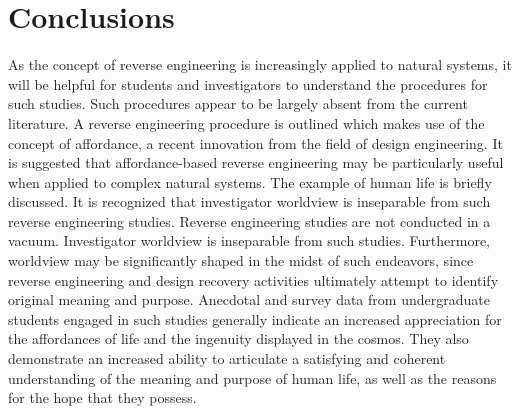 \section{Conclusions}

As the concept of reverse engineering is increasingly applied to natural
systems, it will be helpful for students and investigators to
understand the procedures for such studies. Such procedures appear to
be largely absent from the current literature. A reverse engineering
procedure is outlined which makes use of the concept of affordance, a
recent innovation from the field of design engineering. It is suggested
that affordance-based reverse engineering may be particularly useful
when applied to complex natural systems. The example of human life is
briefly discussed. It is recognized that investigator worldview is
inseparable from such reverse engineering studies. Reverse engineering
studies are not conducted in a vacuum. Investigator worldview is
inseparable from such studies. Furthermore, worldview may be
significantly shaped in the midst of such endeavors, since reverse
engineering and design recovery activities ultimately attempt to
identify original meaning and purpose. Anecdotal and survey data from
undergraduate students engaged in such studies generally indicate an
increased appreciation for the affordances of life and the ingenuity
displayed in the cosmos. They also demonstrate an increased ability to
articulate a satisfying and coherent understanding of the meaning and
purpose of human life, as well as the reasons for the hope that they
possess.


